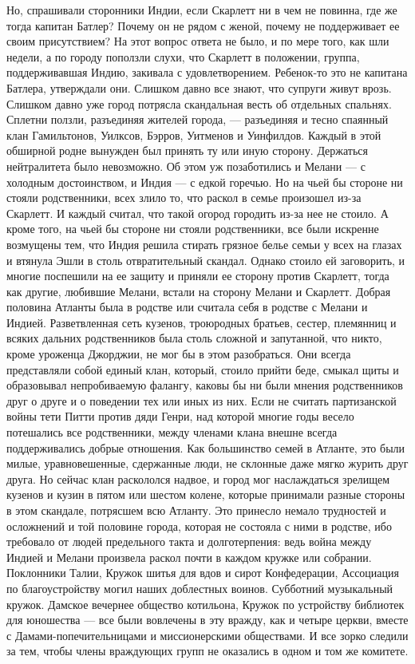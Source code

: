 Но, спрашивали сторонники Индии, если Скарлетт ни в чем не повинна, где же тогда капитан Батлер? Почему он не рядом с женой, почему не поддерживает ее своим присутствием? На этот вопрос ответа не было, и по мере того, как шли недели, а по городу поползли слухи, что Скарлетт в положении, группа, поддерживавшая Индию, закивала с удовлетворением. Ребенок-то это не капитана Батлера, утверждали они. Слишком давно все знают, что супруги живут врозь. Слишком давно уже город потрясла скандальная весть об отдельных спальнях.
Сплетни ползли, разъединяя жителей города, — разъединяя и тесно спаянный клан Гамильтонов, Уилксов, Бэрров, Уитменов и Уинфилдов. Каждый в этой обширной родне вынужден был принять ту или иную сторону. Держаться нейтралитета было невозможно. Об этом уж позаботились и Мелани — с холодным достоинством, и Индия — с едкой горечью. Но на чьей бы стороне ни стояли родственники, всех злило то, что раскол в семье произошел из-за Скарлетт. И каждый считал, что такой огород городить из-за нее не стоило. А кроме того, на чьей бы стороне ни стояли родственники, все были искренне возмущены тем, что Индия решила стирать грязное белье семьи у всех на глазах и втянула Эшли в столь отвратительный скандал. Однако стоило ей заговорить, и многие поспешили на ее защиту и приняли ее сторону против Скарлетт, тогда как другие, любившие Мелани, встали на сторону Мелани и Скарлетт.
Добрая половина Атланты была в родстве или считала себя в родстве с Мелани и Индией. Разветвленная сеть кузенов, троюродных братьев, сестер, племянниц и всяких дальних родственников была столь сложной и запутанной, что никто, кроме уроженца Джорджии, не мог бы в этом разобраться. Они всегда представляли собой единый клан, который, стоило прийти беде, смыкал щиты и образовывал непробиваемую фалангу, каковы бы ни были мнения родственников друг о друге и о поведении тех или иных из них. Если не считать партизанской войны тети Питти против дяди Генри, над которой многие годы весело потешались все родственники, между членами клана внешне всегда поддерживались добрые отношения. Как большинство семей в Атланте, это были милые, уравновешенные, сдержанные люди, не склонные даже мягко журить друг друга.
Но сейчас клан раскололся надвое, и город мог наслаждаться зрелищем кузенов и кузин в пятом или шестом колене, которые принимали разные стороны в этом скандале, потрясшем всю Атланту. Это принесло немало трудностей и осложнений и той половине города, которая не состояла с ними в родстве, ибо требовало от людей предельного такта и долготерпения: ведь война между Индией и Мелани произвела раскол почти в каждом кружке или собрании. Поклонники Талии, Кружок шитья для вдов и сирот Конфедерации, Ассоциация по благоустройству могил наших доблестных воинов. Субботний музыкальный кружок. Дамское вечернее общество котильона, Кружок по устройству библиотек для юношества — все были вовлечены в эту вражду, как и четыре церкви, вместе с Дамами-попечительницами и миссионерскими обществами. И все зорко следили за тем, чтобы члены враждующих групп не оказались в одном и том же комитете.
